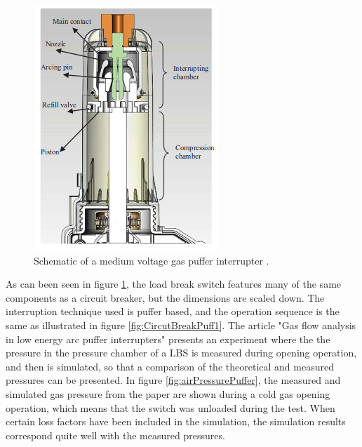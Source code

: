 \documentclass[10pt,b5paper,twoside]{article}
\begin{document}
\begin{figure} [H]
\centering
\includegraphics[scale=0.6]{Bilder/Theory/LBSselfblastandPuffer.png}
\caption{Schematic of a medium voltage gas puffer interrupter \cite{bib:CBAC}.} \label{fig:selfBlastandPuffer}
\end{figure}

As can been seen in figure \ref{fig:selfBlastandPuffer}, the load break switch features many of the same components as a circuit breaker, but the dimensions are scaled down. The interruption technique used is puffer based, and the operation sequence is the same as illustrated in figure \ref{fig:CircutBreakPuff1}. The article "Gas flow analysis in low energy arc puffer interrupters" \cite{bib:CBAC} presents an experiment where the the pressure in the pressure chamber of a LBS is measured during opening operation, and then is simulated, so that a comparison of the theoretical and measured pressures can be presented. In figure \ref{fig:airPressurePuffer}, the measured and simulated gas pressure from the paper are shown during a cold gas opening operation, which means that the switch was unloaded during the test. When certain loss factors have been included in the simulation, the simulation results correspond quite well with the measured pressures.
\end{document}
